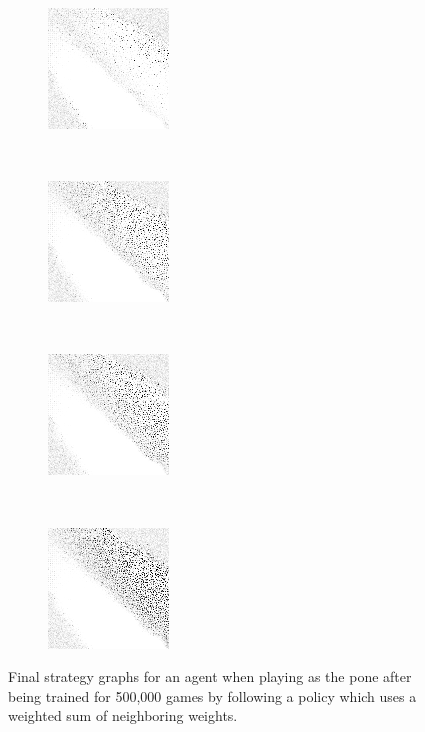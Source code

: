 \begin{figure}
	\begin{subfigure}[t]{0.22\textwidth}
		\center
		\includegraphics[width=\stratgraphwidth]{images/findings/experiments/neighbors/strats/crib_min_avg.png}
		\caption{\cribminavg}
	\end{subfigure}
	~
	\begin{subfigure}[t]{0.22\textwidth}
		\center
		\includegraphics[width=\stratgraphwidth]{images/findings/experiments/neighbors/strats/pegging_max_avg_gained.png}
		\caption{\peggingmaxavggained}
	\end{subfigure}
~
	\begin{subfigure}[t]{0.22\textwidth}
		\center
		\includegraphics[width=\stratgraphwidth]{images/findings/experiments/neighbors/strats/pegging_max_med_gained.png}
		\caption{\peggingmaxmedgained}
	\end{subfigure}
	~
	\begin{subfigure}[t]{0.22\textwidth}
		\center
		\includegraphics[width=\stratgraphwidth]{images/findings/experiments/neighbors/strats/pegging_min_avg_given.png}
		\caption{\peggingminavggiven}
	\end{subfigure}

\caption{
	Final strategy graphs for an agent when playing as the pone
	after being trained for 500,000 games
	by following a policy which uses a weighted sum of neighboring weights.
}
\label{fig:neighbor-strats}
\end{figure}
